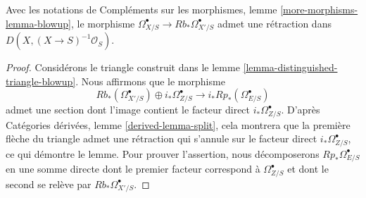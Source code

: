 \begin{proposition}
\label{proposition-blowup-split}
Avec les notations de Compléments sur les morphismes, lemme \ref{more-morphisms-lemma-blowup},
le morphisme $\Omega^\bullet_{X/S} \to Rb_*\Omega^\bullet_{X'/S}$
admet une rétraction dans $D(X, (X \to S)^{-1}\mathcal{O}_S)$.
\end{proposition}

\begin{proof}
Considérons le triangle construit dans le
lemme \ref{lemma-distinguished-triangle-blowup}.
Nous affirmons que le morphisme
$$
Rb_*(\Omega^\bullet_{X'/S}) \oplus i_*\Omega^\bullet_{Z/S} \to
i_*Rp_*(\Omega^\bullet_{E/S})
$$
admet une section dont l'image contient le facteur direct $i_*\Omega^\bullet_{Z/S}$.
D'après Catégories dérivées, lemme \ref{derived-lemma-split}, cela montrera que
la première flèche du triangle admet une rétraction qui s'annule sur
le facteur direct $i_*\Omega^\bullet_{Z/S}$, ce qui démontre le lemme.
Pour prouver l'assertion, nous décomposerons $Rp_*\Omega^\bullet_{E/S}$
en une somme directe dont le premier facteur correspond à
$\Omega^\bullet_{Z/S}$ et dont le second se relève
par $Rb_*\Omega^\bullet_{X'/S}$.


\end{proof}

